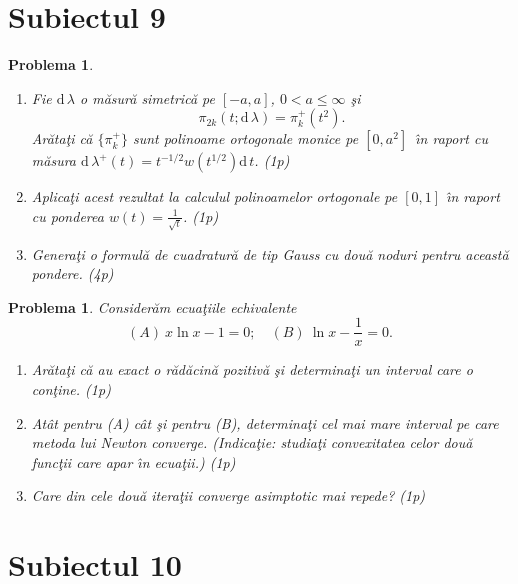 \documentclass[a4paper]{article}%
\newtheorem{problem}[theorem]{Problema}
\begin{document}
\section*{Subiectul 9}

\begin{problem}
\label{pb4.35}

\begin{enumerate}
\item[(a)] Fie $\mathrm{d\,}\lambda$ o m\u{a}sur\u{a} simetric\u{a} pe
$[-a,a]$, $0<a\leq\infty$ \c{s}i
\[
\pi_{2k}(t;\mathrm{d\,}\lambda)=\pi_{k}^{+}(t^{2}).
\]
Ar\u{a}ta\c{t}i c\u{a} $\{\pi_{k}^{+}\}$ sunt polinoame ortogonale monice pe
$[0,a^{2}]$\ \^{\i}n raport cu m\u{a}sura $\mathrm{d\,}\lambda^{+}%
(t)=t^{-1/2}w(t^{1/2})\mathrm{d\,}t$. (1p)

\item[(b)] Aplica\c{t}i acest rezultat la calculul polinoamelor ortogonale pe
$[0,1]$ \^{\i}n raport cu ponderea $w(t)=\frac{1}{\sqrt{t}}$. (1p)

\item[(c)] Genera\c{t}i o formul\u{a} de cuadratur\u{a} de tip Gauss cu
dou\u{a} noduri pentru aceast\u{a} pondere. (4p)
\end{enumerate}
\end{problem}

\begin{problem}
\label{Gautschip4.27}Consider\u{a}m ecua\c{t}iile echivalente%
\[
(A)~x\ln x-1=0;\quad(B)~\ln x-\frac{1}{x}=0.
\]


\begin{enumerate}
\item[(a)] Ar\u{a}ta\c{t}i c\u{a} au exact o r\u{a}d\u{a}cin\u{a} pozitiv\u{a}
\c{s}i determina\c{t}i un interval care o con\c{t}ine. (1p)

\item[(b)] At\^{a}t pentru (A) c\^{a}t \c{s}i pentru (B), determina\c{t}i cel
mai mare interval pe care metoda lui Newton converge. (\emph{Indica\c{t}ie}:
studia\c{t}i convexitatea celor dou\u{a} func\c{t}ii care apar \^{\i}n
ecua\c{t}ii.) (1p)

\item[(c)] Care din cele dou\u{a} itera\c{t}ii converge asimptotic mai repede? (1p)
\end{enumerate}
\end{problem}

\newpage

\section*{Subiectul 10}
\end{document}
